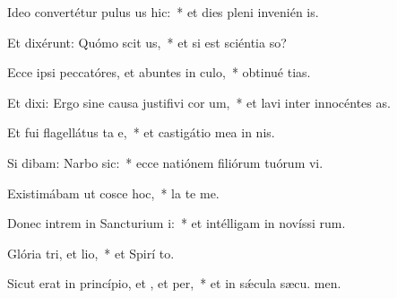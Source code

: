 \item Ideo convertétur pulus us hic:~* et dies pleni invenién  is.
\item Et dixérunt: Quómo scit us,~* et si est sciéntia  so?
\item Ecce ipsi peccatóres, et abuntes in culo,~* obtinué tias.
\item Et dixi: Ergo sine causa justifivi cor um,~* et lavi inter innocéntes  as.
\item Et fui flagellátus ta e,~* et castigátio mea in nis.
\item Si dibam: Narbo sic:~* ecce natiónem filiórum tuórum vi.
\item Existimábam ut cosce hoc,~* la  te me.
\item Donec intrem in Sancturium i:~* et intélligam in novíssi rum.
\item Glória tri, et lio,~* et Spirí to.
\item Sicut erat in princípio, et , et per,~* et in sǽcula sæcu. men.
